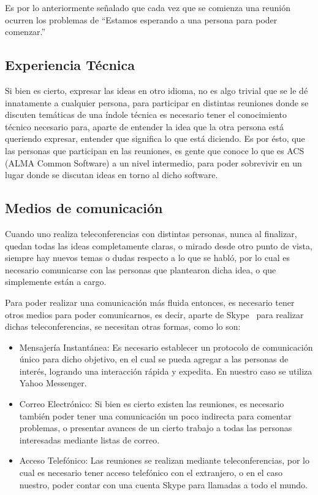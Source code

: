 Es por lo anteriormente señalado que cada vez que se comienza una
reunión ocurren los problemas de ``Estamos esperando a una persona
para poder comenzar.''

\subsection{Experiencia Técnica}
Si bien es cierto, expresar las ideas en otro idioma, no es algo
trivial que se le dé innatamente a cualquier persona, para participar
en distintas reuniones donde se discuten temáticas de una índole técnica
es necesario tener el conocimiento técnico necesario para, aparte de
entender la idea que la otra persona está queriendo expresar, entender
que significa lo que está diciendo.
Es por ésto, que las personas que participan en las reuniones,
es gente que conoce lo que es ACS (ALMA Common Software) a un nivel
intermedio, para poder sobrevivir en un lugar donde se discutan ideas
en torno al dicho software.

\subsection{Medios de comunicación}
Cuando uno realiza teleconferencias con distintas personas,
nunca al finalizar, quedan todas las ideas completamente claras,
o mirado desde otro punto de vista, siempre hay nuevos temas
o dudas respecto a lo que se habló, por lo cual es necesario
comunicarse con las personas que plantearon dicha idea, o que
simplemente están a cargo.

Para poder realizar una comunicación más fluida entonces,
es necesario tener otros medios para poder comunicarnos,
es decir, aparte de Skype~\cite{Skype} para realizar
dichas teleconferencias, se necesitan otras formas, como lo son:
\begin{itemize}
   \item Mensajería Instantánea: Es necesario establecer un protocolo de comunicación
		único para dicho objetivo, en el cual se pueda agregar a las personas de interés, logrando
		una interacción rápida y expedita. En nuestro caso se utiliza Yahoo Messenger.
   \item Correo Electrónico: Si bien es cierto existen las reuniones, es necesario también
		poder tener una comunicación un poco indirecta para comentar problemas, o presentar
		avances de un cierto trabajo a todas las personas interesadas mediante listas de correo.
   \item Acceso Telefónico: Las reuniones se realizan mediante teleconferencias, por lo cual
		es necesario tener acceso telefónico con el extranjero, o en el caso nuestro, poder
		contar con una cuenta Skype para llamadas a todo el mundo.
\end{itemize}

